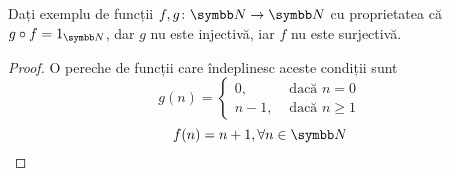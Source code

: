 \begin{exercise}
Dați exemplu de funcții \(\function{f, g}{\naturals}{\naturals}\) cu proprietatea că \(g \circ f = 1_{\naturals}\), dar \(g\) nu este injectivă, iar \(f\) nu este surjectivă.
\end{exercise}
\begin{proof}
O pereche de funcții care îndeplinesc aceste condiții sunt
\[
g(n) = \begin{cases}
0, &\text{ dacă } n = 0 \\
n - 1, &\text{ dacă } n \geq 1
\end{cases}
\]
\[
f(n) = n + 1, \forall n \in \naturals
\]
\end{proof}
